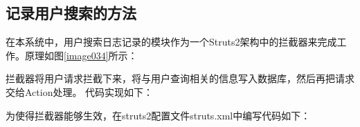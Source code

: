 \subsection{记录用户搜索的方法}
在本系统中，用户搜索日志记录的模块作为一个Struts2架构中的拦截器来完成工作。原理如图\ref{image034}所示：


拦截器将用户请求拦截下来，将与用户查询相关的信息写入数据库，然后再把请求交给Action处理。
代码实现如下：



为使得拦截器能够生效，在struts2配置文件struts.xml中编写代码如下：

